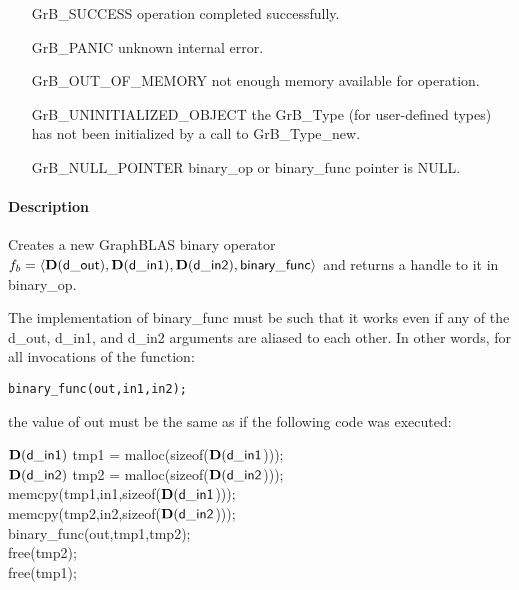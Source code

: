\begin{itemize}[leftmargin=2.1in]
\item[{\sf GrB\_SUCCESS}]           operation completed successfully.
\item[{\sf GrB\_PANIC}]             unknown internal error.
\item[{\sf GrB\_OUT\_OF\_MEMORY}]          not enough memory available for operation.
\item[{\sf GrB\_UNINITIALIZED\_OBJECT}]          the {\sf GrB\_Type} (for user-defined types)
                                    has not been initialized by a call to {\sf GrB\_Type\_new}.
\item[{\sf GrB\_NULL\_POINTER}]    {\sf binary\_op} or {\sf binary\_func} pointer is {\sf NULL}.

\end{itemize}

\paragraph{Description}

Creates a new GraphBLAS binary operator $f_b = \langle \mathbf{D}({\sf d\_out}), 
\mathbf{D}({\sf d\_in1}), \mathbf{D}({\sf d\_in2}), {\sf binary\_func} \rangle$ and
returns a handle to it in {\sf binary\_op}.

The implementation of {\sf binary\_func} must be such that it works
even if any of the {\sf d\_out}, {\sf d\_in1}, and {\sf d\_in2} arguments are aliased to each other.
In other words, for all invocations of the function:
\begin{verbatim}
binary_func(out,in1,in2);
\end{verbatim}
the value of {\sf out} must be the same as if the following code
was executed:

\begin{code}
    $\mathbf{D}({\sf d\_in1})$ tmp1 = malloc(sizeof($\mathbf{D}({\sf d\_in1}$))); \\
    $\mathbf{D}({\sf d\_in2})$ tmp2 = malloc(sizeof($\mathbf{D}({\sf d\_in2}$))); \\
    memcpy(tmp1,in1,sizeof($\mathbf{D}({\sf d\_in1}$))); \\
    memcpy(tmp2,in2,sizeof($\mathbf{D}({\sf d\_in2}$))); \\
    binary\_func(out,tmp1,tmp2); \\
    free(tmp2); \\
    free(tmp1);
\end{code}

